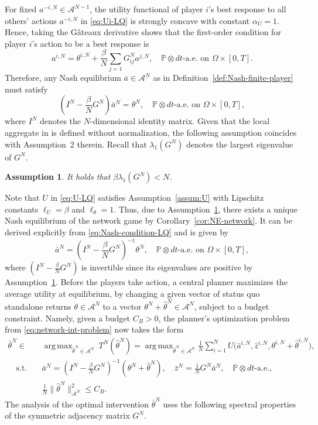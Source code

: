 \documentclass[11pt]{article}
\def\gray#1{\textcolor{gray}{#1}}
\def\P{\mathbb{P}}
\newcommand{\R}{{\mathbb R}}
\DeclareMathOperator*{\argmax}{arg\,max}
\newcommand{\be}{\begin{equation}}
\newcommand{\ee}{\end{equation}}
\newtheorem{assumption}[theorem]{Assumption}
\numberwithin{equation}{section}
\begin{document}

For fixed ${a}^{-i,N}\in\mathcal{A}^{N-1}$, the utility functional of player $i$'s best response to all others' actions ${a}^{-i,N}$ in \eqref{eq:Ui-LQ} is strongly concave with constant $\alpha_U=1$. Hence, taking the G\^ateaux derivative shows that the first-order condition for player $i$'s action to be a best response is
\be\label{eq-LQ:foc}
a^{i,N}=\theta^{i,N}+\frac{\beta}{N} \sum_{j=1} G^N_{ij}a^{j,N},\quad \P \otimes dt \textrm{-a.e.~on } \Omega \times [0,T].
\ee
Therefore, any Nash equilibrium $\bar{a}\in\mathcal{A}^N$ as in Definition~\ref{def:Nash-finite-player} must satisfy
\be\label{eq:Nash-condition-LQ}
(I^N-\frac{\beta}{N}{G}^N)\bar a^N=\theta^N,\quad \P \otimes dt \textrm{-a.e.~on } \Omega \times [0,T],
\ee
where $I^N$ denotes the $N$-dimensional identity matrix. Given that the local aggregate in \cite{galeotti2020targeting} is defined without normalization, the following assumption coincides with Assumption~2 therein.
Recall that $\lambda_{1}(G^N)$ denotes the largest eigenvalue of $G^N$. 
\begin{assumption}\label{assum:spectral-radius}
It holds that $\beta \lambda_{1}(G^N)<N$.
\end{assumption}
Note that $U$ in \eqref{eq:U-LQ} satisfies Assumption~\ref{assum:U} with Lipschitz constants $\ell_U=\beta$ and $\ell_\theta=1$. Thus, due to Assumption~\ref{assum:spectral-radius}, there exists a unique Nash equilibrium of the network game by Corollary~\ref{cor:NE-network}. It can be derived explicitly from \eqref{eq:Nash-condition-LQ} and is given by 
\be\label{eq:Nash-equilibrium-LQ}
\bar{a}^N=(I^N-\frac{\beta}{N}G^N)^{-1}\theta^N,\quad \P \otimes dt \textrm{-a.e.~on } \Omega \times [0,T],
\ee
where $(I^N-\frac{\beta}{N}G^N)$  is invertible since its eigenvalues are positive by Assumption~\ref{assum:spectral-radius}. 
Before the players take action, a central planner maximizes the average utility at equilibrium, by changing a given vector of status quo standalone returns $\theta\in\mathcal{A}^N$ to a vector $\theta^N+\hat\theta^N\in\mathcal{A}^N$, subject to a budget constraint. Namely, given a budget $C_B>0$, the planner's optimization problem from \eqref{eq:network-int-problem} now takes the form
\be\begin{aligned}\label{eq:network-int-problem-LQ}
    \bar\theta^N\in&\argmax_{\hat{\theta}^N\in\mathcal{A}^N}\ T^N(\hat{\theta}^N)= \argmax_{\hat{\theta}^N\in\mathcal{A}^N}\frac{1}{N}\sum_{i=1}^N U\big(\bar a^{i,N},\bar z^{i,N},\theta^{i,N}+\hat{\theta}^{i,N}\big),\\
    \quad \textrm{s.t.}\quad & \bar{a}^N=(I^N-\frac{\beta}{N}G^N)^{-1}(\theta^N+\hat\theta^N),\quad \bar z^{N}=\frac{1}{N} G^N\bar a^N,\quad \P \otimes dt \textrm{-a.e.},\\
    & \frac{1}{N}\|\hat{\theta}^N\|^2_{\mathcal{A}^N}\leq C_B.
\end{aligned}\ee
The analysis of the optimal intervention $\bar\theta^N$ uses the following spectral properties of the symmetric adjacency matrix $G^N$.  
 
\end{document}
